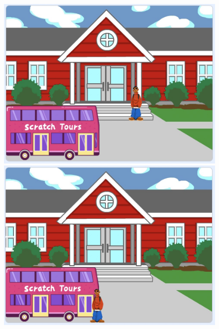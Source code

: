 \documentclass[10pt, a4paper]{article}
\begin{document}
\begin{enumerate}
\begin{figure}[htbp]
\begin{minipage}{.2\textwidth}
                \includegraphics[width=\textwidth]{36-2.jpg}
            \end{minipage}
            \begin{minipage}{.2\textwidth}
                \centering
                \includegraphics[width=\textwidth]{36-3.jpg}
            \end{minipage}
            \begin{minipage}{.2\textwidth}
                \centering

\end{minipage}
\end{figure}
\end{enumerate}
\end{document}
